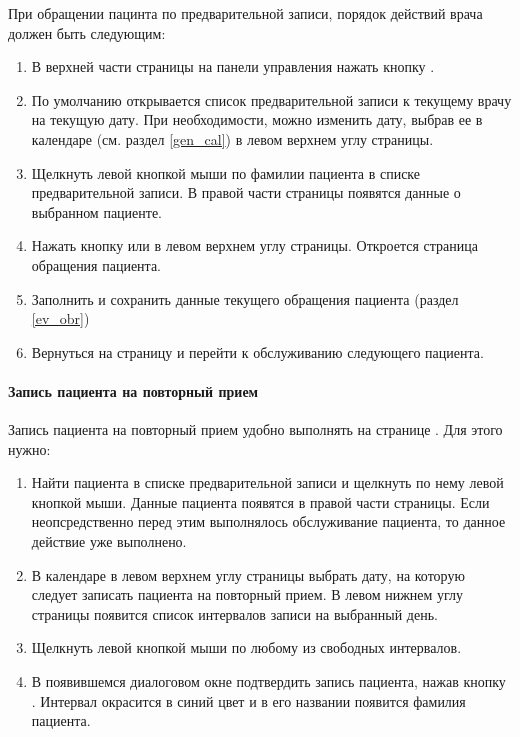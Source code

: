При обращении пацинта по предварительной записи, порядок действий врача должен быть следующим:
\begin{enumerate}
	\item В верхней части страницы на панели управления нажать кнопку .
	\item По умолчанию открывается список предварительной записи к текущему врачу на текущую дату. При необходимости, можно изменить дату, выбрав ее в календаре (см. раздел \ref{gen_cal}) в левом верхнем углу страницы.
	\item Щелкнуть левой кнопкой мыши по фамилии пациента в списке предварительной записи. В правой части страницы появятся данные о выбранном пациенте.
	\item Нажать кнопку  или  в левом верхнем углу страницы. Откроется страница обращения пациента.
	\item Заполнить и сохранить данные текущего обращения пациента (раздел \ref{ev_obr})
	\item Вернуться на страницу  и перейти к обслуживанию следующего пациента.
\end{enumerate}

\paragraph{Запись пациента на повторный прием} 

Запись пациента на повторный прием удобно выполнять на странице . Для этого нужно:
\begin{enumerate}
	\item Найти пациента в списке предварительной записи и щелкнуть по нему левой кнопкой мыши. Данные пациента появятся в правой части страницы. Если неопсредственно перед этим выполнялось обслуживание пациента, то данное действие уже выполнено.
	\item В календаре в левом верхнем углу страницы выбрать дату, на которую следует записать пациента на повторный прием. В левом нижнем углу страницы появится список интервалов записи на выбранный день.
	\item Щелкнуть левой кнопкой мыши по любому из свободных интервалов.
	\item В появившемся диалоговом окне подтвердить запись пациента, нажав кнопку . Интервал окрасится в синий цвет и в его названии появится фамилия пациента.
\end{enumerate} 


